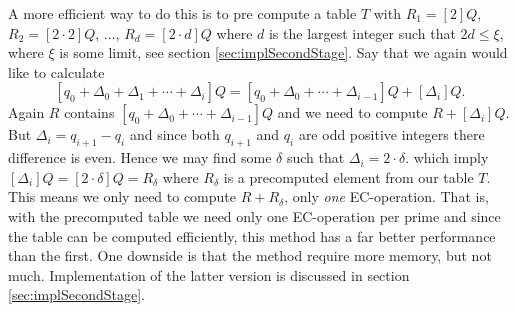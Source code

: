 A more efficient way to do this is to pre compute a table $T$ with $R_1=[2]Q$, $R_2=[2\cdot 2]Q$, $...$, $R_d=[2\cdot d]Q$ where $d$ is the largest integer such that $2d\leq \xi$, where $\xi$ is some limit, see section \ref{sec:implSecondStage}. Say that we again would like to calculate  
\[
[q_0+\Delta_0+\Delta_1+\cdots+\Delta_i]Q=[q_0+\Delta_0+\cdots +\Delta_{i-1}]Q+[\Delta_i]Q.
\]
Again $R$ contains $[q_0+\Delta_0+\cdots+\Delta_{i-1}]Q$ and we need to compute $R+[\Delta_{i}]Q$. But $\Delta_i=q_{i+1}-q_i$ and since both $q_{i+1}$ and $q_i$ are odd positive integers there difference is even. Hence we may find some $\delta$ such that $\Delta_i=2\cdot\delta$. which imply $[\Delta_i]Q=[2\cdot\delta]Q=R_\delta$ where $R_\delta$ is a precomputed element from our table $T$. This means we only need to compute $R+R_\delta$, only \textit{one} EC-operation. That is, with the precomputed table we need only one EC-operation per prime and since the table can be computed efficiently, this method has a far better performance than the first. One downside is that the method require more memory, but not much. Implementation of the latter version is discussed in section \ref{sec:implSecondStage}.